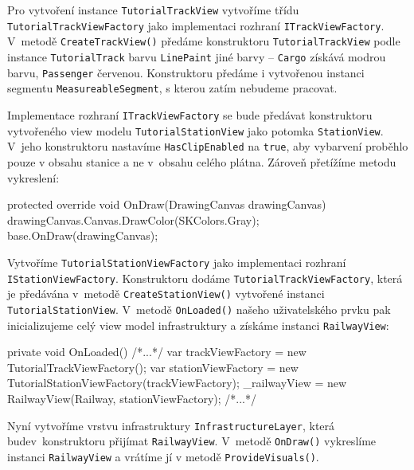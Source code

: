Pro vytvoření instance \texttt{TutorialTrackView} vytvoříme třídu \linebreak \texttt{TutorialTrackViewFactory} jako implementaci rozhraní \texttt{ITrackViewFactory}. V~metodě \texttt{CreateTrackView()} předáme konstruktoru \texttt{TutorialTrackView} podle instance \texttt{TutorialTrack} barvu \texttt{LinePaint} jiné barvy -- \texttt{Cargo} získává modrou barvu, \texttt{Passenger} červenou. Konstruktoru předáme i vytvořenou instanci \linebreak segmentu \texttt{MeasureableSegment}, s kterou zatím nebudeme pracovat.

Implementace rozhraní \texttt{ITrackViewFactory} se bude předávat konstruktoru vytvořeného view modelu \texttt{TutorialStationView} jako potomka \texttt{StationView}. V~jeho konstruktoru nastavíme \texttt{HasClipEnabled} na \texttt{true}, aby vybarvení proběhlo pouze v obsahu stanice a ne v~obsahu celého plátna. Zároveň přetížíme metodu vykreslení:

\begin{csharpcode}
protected override void OnDraw(DrawingCanvas drawingCanvas) {
	drawingCanvas.Canvas.DrawColor(SKColors.Gray);
	base.OnDraw(drawingCanvas);
} 
\end{csharpcode}

Vytvoříme \texttt{TutorialStationViewFactory} jako implementaci rozhraní \linebreak\texttt{IStationViewFactory}. Konstruktoru dodáme \texttt{TutorialTrackViewFactory}, \linebreak která je předávána v~metodě \texttt{CreateStationView()} vytvořené instanci \linebreak \texttt{TutorialStationView}. V~metodě \texttt{OnLoaded()} našeho uživatelského prvku pak inicializujeme celý view model infrastruktury a získáme instanci \texttt{RailwayView}:

\begin{csharpcode}
private void OnLoaded() {
  /*...*/
  var trackViewFactory = new TutorialTrackViewFactory();
  var stationViewFactory = new TutorialStationViewFactory(trackViewFactory);
  _railwayView = new RailwayView(Railway, stationViewFactory);
  /*...*/
}
\end{csharpcode}

Nyní vytvoříme vrstvu infrastruktury \texttt{InfrastructureLayer}, která bude\linebreak v~konstruktoru přijímat \texttt{RailwayView}. V~metodě \texttt{OnDraw()} vykreslíme instanci \texttt{RailwayView} a vrátíme jí v metodě \texttt{ProvideVisuals()}.

